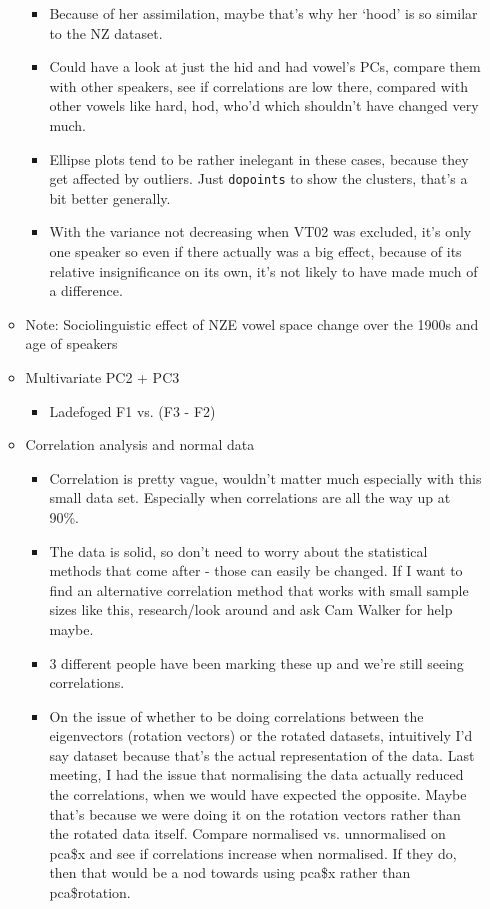 \documentclass{article}
\begin{document}
\begin{itemize}
\begin{itemize}
\begin{itemize}
            \item Because of her assimilation, maybe that's why her `hood' is so similar to the NZ dataset.
            \item Could have a look at just the hid and had vowel's PCs, compare them with other speakers, see if correlations are low there, compared with other vowels like hard, hod, who'd which shouldn't have changed very much.
            \item Ellipse plots tend to be rather inelegant in these cases, because they get affected by outliers. Just \verb|dopoints| to show the clusters, that's a bit better generally.
            \item With the variance not decreasing when VT02 was excluded, it's only one speaker so even if there actually was a big effect, because of its relative insignificance on its own, it's not likely to have made much of a difference.
        \end{itemize}
        \item Note: Sociolinguistic effect of NZE vowel space change over the 1900s and age of speakers
        \item Multivariate PC2 + PC3
        \begin{itemize}
            \item Ladefoged F1 vs. (F3 - F2)
        \end{itemize}
        \item Correlation analysis and normal data
        \begin{itemize}
            \item Correlation is pretty vague, wouldn't matter much especially with this small data set. Especially when correlations are all the way up at 90\%.
            \item The data is solid, so don't need to worry about the statistical methods that come after - those can easily be changed. If I want to find an alternative correlation method that works with small sample sizes like this, research/look around and ask Cam Walker for help maybe.
            \item 3 different people have been marking these up and we're still seeing correlations.
            \item On the issue of whether to be doing correlations between the eigenvectors (rotation vectors) or the rotated datasets, intuitively I'd say dataset because that's the actual representation of the data. Last meeting, I had the issue that normalising the data actually reduced the correlations, when we would have expected the opposite. Maybe that's because we were doing it on the rotation vectors rather than the rotated data itself. Compare normalised vs. unnormalised on pca\$x and see if correlations increase when normalised. If they do, then that would be a nod towards using pca\$x rather than pca\$rotation.

\end{itemize}
\end{itemize}
\end{itemize}
\end{document}
